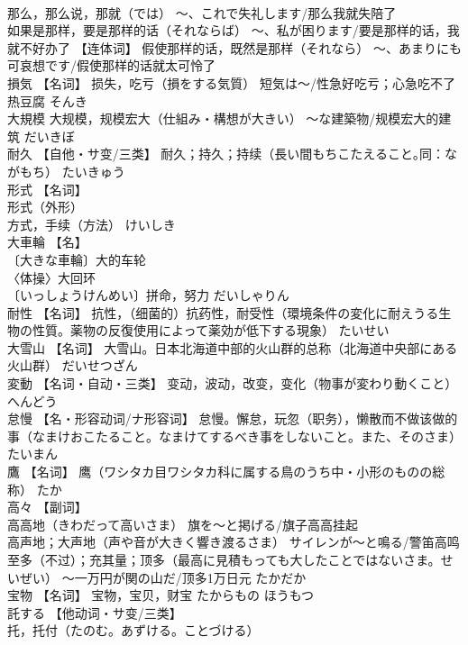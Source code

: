 \documentclass[8pt]{extreport}
\begin{document}
\begin{CJK}{UTF8}{min}
\\	那么，那么说，那就（では） ～、これで失礼します/那么我就失陪了 
\\	如果是那样，要是那样的话（それならば） ～、私が困ります/要是那样的话，我就不好办了 【连体词】 假使那样的话，既然是那样（それなら） ～、あまりにも可哀想です/假使那样的话就太可怜了		
\\	損気	【名词】 损失，吃亏（損をする気質） 短気は～/性急好吃亏；心急吃不了热豆腐	そんき	
\\	大規模	大规模，规模宏大（仕組み・構想が大きい） ～な建築物/规模宏大的建筑	だいきぼ	
\\	耐久	【自他・サ变/三类】 耐久；持久；持续（長い間もちこたえること｡同：ながもち）	たいきゅう	
\\	形式	【名词】 
\\	形式（外形） 
\\	方式，手续（方法）	けいしき	
\\	大車輪	【名】 
\\	〔大きな車輪〕大的车轮 
\\	〈体操〉大回环 
\\	〔いっしょうけんめい〕拼命，努力	だいしゃりん	
\\	耐性	【名词】 抗性，（细菌的）抗药性，耐受性（環境条件の変化に耐えうる生物の性質。薬物の反復使用によって薬効が低下する現象）	たいせい	
\\	大雪山	【名词】 大雪山。日本北海道中部的火山群的总称（北海道中央部にある火山群）	だいせつざん	
\\	変動	【名词・自动・三类】 变动，波动，改变，变化（物事が変わり動くこと）	へんどう	
\\	怠慢	【名・形容动词/ナ形容词】 怠慢。懈怠，玩忽（职务），懒散而不做该做的事（なまけおこたること。なまけてするべき事をしないこと。また、そのさま）	たいまん	
\\	鷹	【名词】 鹰（ワシタカ目ワシタカ科に属する鳥のうち中・小形のものの総称）	たか	
\\	高々	【副词】 
\\	高高地（きわだって高いさま） 旗を～と掲げる/旗子高高挂起 
\\	高声地；大声地（声や音が大きく響き渡るさま） サイレンが～と鳴る/警笛高鸣 
\\	至多（不过）；充其量；顶多（最高に見積もっても大したことではないさま。せいぜい） ～一万円が関の山だ/顶多1万日元	たかだか	
\\	宝物	【名词】 宝物，宝贝，财宝	たからもの ほうもつ	
\\	託する	【他动词・サ变/三类】 
\\	托，托付（たのむ。あずける。ことづける） 

\end{CJK}
\end{document}
